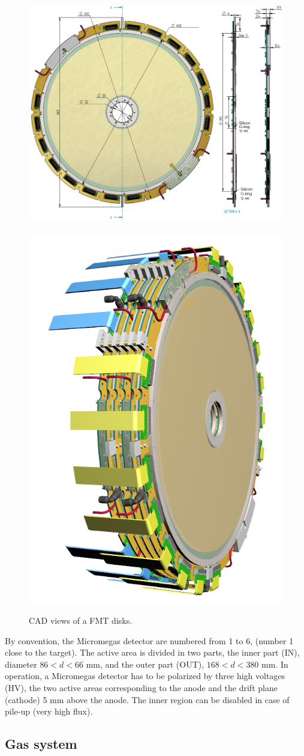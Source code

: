 \begin{figure}[htb]
 
\includegraphics[width=0.66\columnwidth,keepaspectratio]{images/fig6_1}~\includegraphics[width=0.33\columnwidth,
keepaspectratio]{images/fig6_2}
 \caption{CAD views of a FMT disks.}
 \label{fig:mm-fig5}
\end{figure}

By convention, the Micromegas detector are numbered from 1 to 6, (number 1 close to the target). The active area is 
divided in two parts, the inner part (IN),  diameter  $86 < d < 66$ mm, and the outer part (OUT), $168 < d < 380$ mm. 
In operation, a Micromegas detector has to be polarized by three high voltages (HV), the two active areas corresponding 
to the anode and the drift plane (cathode) 5 mm above the anode. The inner region can be disabled in case of pile-up 
(very high flux).


\subsection{Gas system}

